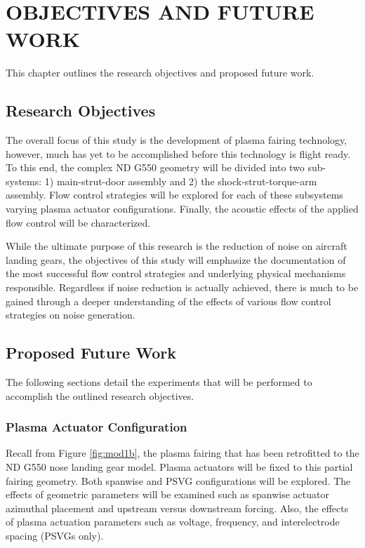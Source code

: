 %
%

\chapter{OBJECTIVES AND FUTURE WORK}
This chapter outlines the research objectives and proposed future work. 

\section{Research Objectives}
The overall focus of this study is the development of plasma fairing technology, however, much has yet to be accomplished before this technology is flight ready. To this end, the complex ND G550 geometry will be divided into two sub-systems: 1) main-strut-door assembly and 2) the shock-strut-torque-arm assembly. Flow control strategies will be explored for each of these subsystems varying plasma actuator configurations. Finally, the acoustic effects of the applied flow control will be characterized.


While the ultimate purpose of this research is the reduction of noise on aircraft landing gears, the objectives of this study will emphasize the documentation of the most successful flow control strategies and underlying physical mechanisms responsible. Regardless if noise reduction is actually achieved, there is much to be gained through a deeper understanding of the effects of various flow control strategies on noise generation.

\section{Proposed Future Work}
The following sections detail the experiments that will be performed to accomplish the outlined research objectives.

\subsection{Plasma Actuator Configuration}
Recall from Figure \ref{fig:mod1b}, the plasma fairing that has been retrofitted to the ND G550 nose landing gear model. Plasma actuators will be fixed to this partial fairing geometry. Both spanwise and PSVG configurations will be explored. The effects of geometric parameters will be examined such as spanwise actuator azimuthal placement and upstream versus downstream forcing. Also, the effects of plasma actuation parameters such as voltage, frequency, and interelectrode spacing (PSVGs only).


